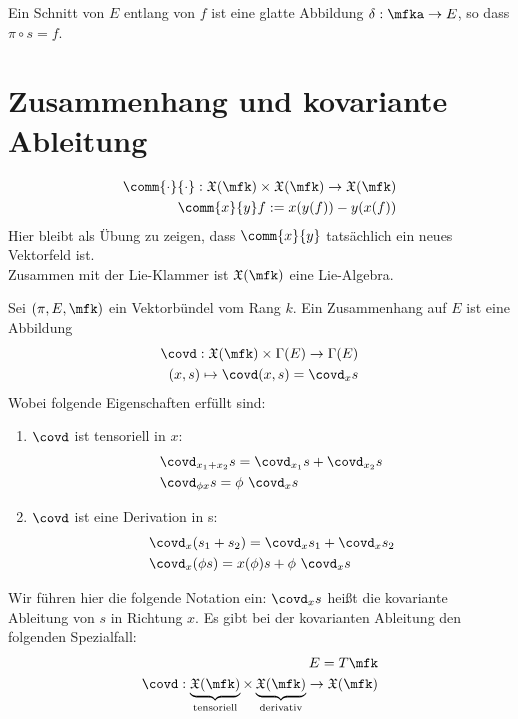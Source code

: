 \begin{defs}
Ein Schnitt von $E$ entlang von $f$ ist eine glatte Abbildung $\delta : \mfka \to E$, so dass $\pi \circ s = f$. 
\end{defs}

\section{Zusammenhang und kovariante Ableitung}

\begin{defs}
\begin{align}
\comm{\cdot}{\cdot} : \mathfrak{X}(\mfk) \times \mathfrak{X}(\mfk) \to \mathfrak{X}(\mfk)\\
\comm{x}{y} f := x(y(f)) - y(x(f))
\end{align}
Hier bleibt als Übung zu zeigen, dass $\comm{x}{y}$ tatsächlich ein neues Vektorfeld ist.\\
Zusammen mit der Lie-Klammer ist $\mathfrak{X}(\mfk)$ eine Lie-Algebra.
\end{defs}

\begin{defs}[Zusammenhang]
Sei $(\pi, E, \mfk)$ ein Vektorbündel vom Rang $k$.
Ein Zusammenhang auf $E$ ist eine Abbildung
\begin{align}
\covd : \mathfrak{X}(\mfk) \times \Gamma(E) \to \Gamma (E) \\
(x, s) \mapsto \covd (x, s) = \covd_x s
\end{align}
Wobei folgende Eigenschaften erfüllt sind:
\begin{enumerate}
\item $\covd$ ist tensoriell in $x$: 
\begin{align}
&\covd_{x_1 + x_2} s = \covd_{x_1} s + \covd_{x_2} s \\
&\covd_{\phi x} s = \phi \ \covd_x s
\end{align}
\item $\covd$ ist eine Derivation in s:
\begin{align}
&\covd_x (s_1 + s_2) = \covd_x s_1 + \covd_x s_2\\
&\covd_x (\phi s) = x(\phi) s + \phi \ \covd_x  s
\end{align}
\end{enumerate}
\end{defs}

Wir führen hier die folgende Notation ein:
$\covd_x s$ heißt die kovariante Ableitung von $s$ in Richtung $x$.
Es gibt bei der kovarianten Ableitung den folgenden Spezialfall:
\begin{align}
E = T\mfk\\
\covd: \underbrace{\mathfrak{X}(\mfk)}_{\mathrm{tensoriell}} \times \underbrace{\mathfrak{X}(\mfk)}_{\mathrm{derivativ}} \to \mathfrak{X}(\mfk)
\end{align}

